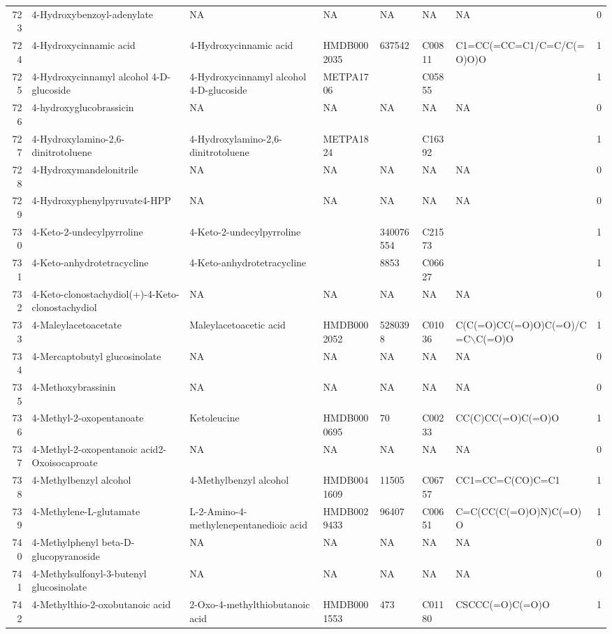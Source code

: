 \documentclass[a4paper]{article}
\begin{document}
\begin{longtable}{rlllllll}
  723 & 4-Hydroxybenzoyl-adenylate & NA & NA & NA & NA & NA & 0 \\ 
  724 & 4-Hydroxycinnamic acid & 4-Hydroxycinnamic acid & HMDB0002035 & 637542 & C00811 & C1=CC(=CC=C1/C=C/C(=O)O)O & 1 \\ 
  725 & 4-Hydroxycinnamyl alcohol 4-D-glucoside & 4-Hydroxycinnamyl alcohol 4-D-glucoside & METPA1706 &  & C05855 &  & 1 \\ 
  726 & 4-hydroxyglucobrassicin & NA & NA & NA & NA & NA & 0 \\ 
  727 & 4-Hydroxylamino-2,6-dinitrotoluene & 4-Hydroxylamino-2,6-dinitrotoluene & METPA1824 &  & C16392 &  & 1 \\ 
  728 & 4-Hydroxymandelonitrile & NA & NA & NA & NA & NA & 0 \\ 
  729 & 4-Hydroxyphenylpyruvate4-HPP & NA & NA & NA & NA & NA & 0 \\ 
  730 & 4-Keto-2-undecylpyrroline & 4-Keto-2-undecylpyrroline &  & 340076554 & C21573 &  & 1 \\ 
  731 & 4-Keto-anhydrotetracycline & 4-Keto-anhydrotetracycline &  & 8853 & C06627 &  & 1 \\ 
  732 & 4-Keto-clonostachydiol(+)-4-Keto-clonostachydiol & NA & NA & NA & NA & NA & 0 \\ 
  733 & 4-Maleylacetoacetate & Maleylacetoacetic acid & HMDB0002052 & 5280398 & C01036 & C(C(=O)CC(=O)O)C(=O)/C=C$\backslash$C(=O)O & 1 \\ 
  734 & 4-Mercaptobutyl glucosinolate & NA & NA & NA & NA & NA & 0 \\ 
  735 & 4-Methoxybrassinin & NA & NA & NA & NA & NA & 0 \\ 
  736 & 4-Methyl-2-oxopentanoate & Ketoleucine & HMDB0000695 & 70 & C00233 & CC(C)CC(=O)C(=O)O & 1 \\ 
  737 & 4-Methyl-2-oxopentanoic acid2-Oxoisocaproate & NA & NA & NA & NA & NA & 0 \\ 
  738 & 4-Methylbenzyl alcohol & 4-Methylbenzyl alcohol & HMDB0041609 & 11505 & C06757 & CC1=CC=C(CO)C=C1 & 1 \\ 
  739 & 4-Methylene-L-glutamate & L-2-Amino-4-methylenepentanedioic acid & HMDB0029433 & 96407 & C00651 & C=C(CC(C(=O)O)N)C(=O)O & 1 \\ 
  740 & 4-Methylphenyl beta-D-glucopyranoside & NA & NA & NA & NA & NA & 0 \\ 
  741 & 4-Methylsulfonyl-3-butenyl glucosinolate & NA & NA & NA & NA & NA & 0 \\ 
  742 & 4-Methylthio-2-oxobutanoic acid & 2-Oxo-4-methylthiobutanoic acid & HMDB0001553 & 473 & C01180 & CSCCC(=O)C(=O)O & 1 \\ 

\end{longtable}
\end{document}
